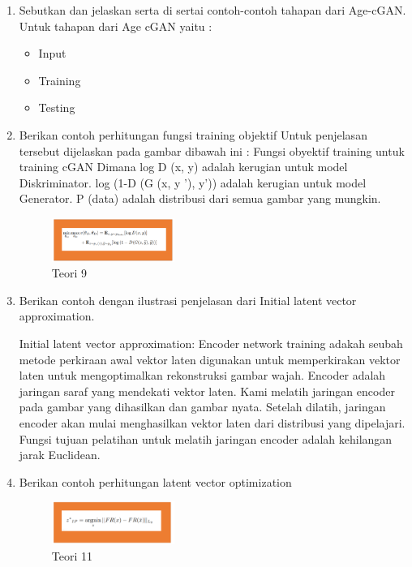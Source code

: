 \begin{enumerate}

	\item Sebutkan dan jelaskan serta di sertai contoh-contoh tahapan dari Age-cGAN.
	\hfill\break
	Untuk tahapan dari Age cGAN yaitu :
	\begin{itemize}
		\item Input
		\item Training
		\item Testing
	\end{itemize}

	\item Berikan contoh perhitungan fungsi training objektif
	\hfill\break
	Untuk penjelasan tersebut dijelaskan pada gambar dibawah ini :
	Fungsi obyektif training untuk training cGAN Dimana log D (x, y) adalah kerugian untuk model Diskriminator. log (1-D (G (x, y ’), y’)) adalah kerugian untuk model Generator. P (data) adalah distribusi dari semua gambar yang mungkin.

	\begin{figure}[H]
	\centering
		\includegraphics[width=4cm]{figures/1174021/tugas9/materi/teori9.PNG}
		\caption{Teori 9}
	\end{figure}

	\item Berikan contoh dengan ilustrasi penjelasan dari Initial latent vector approximation.
	\hfill\break

	Initial latent vector approximation: Encoder network training adakah seubah metode perkiraan awal vektor laten digunakan untuk memperkirakan vektor laten untuk mengoptimalkan rekonstruksi gambar wajah. Encoder adalah jaringan saraf yang mendekati vektor laten. Kami melatih jaringan encoder pada gambar yang dihasilkan dan gambar nyata. Setelah dilatih, jaringan encoder akan mulai menghasilkan vektor laten dari distribusi yang dipelajari. Fungsi tujuan pelatihan untuk melatih jaringan encoder adalah kehilangan jarak Euclidean.

	\item Berikan contoh perhitungan latent vector optimization
	\hfill\break

	\begin{figure}[H]
	\centering
		\includegraphics[width=4cm]{figures/1174021/tugas9/materi/teori11.PNG}
		\caption{Teori 11}
	\end{figure}
\end{enumerate}

